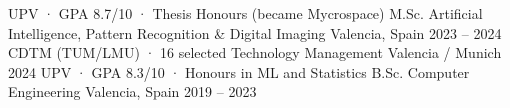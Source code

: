 \nopagebreak
\begin{cventries}
\cvkeep
\cvdegree
    {UPV · GPA 8.7/10 · Thesis Honours (became Mycrospace)}
    {M.Sc. Artificial Intelligence, Pattern Recognition \& Digital Imaging}
    {Valencia, Spain}
    {2023 – 2024}
\cvkeep
\cvdegree
    {CDTM (TUM/LMU) · 16 selected}
    {Technology Management}
    {Valencia / Munich}
    {2024}
\cvkeep
\cvdegree
    {UPV · GPA 8.3/10 · Honours in ML and Statistics}
    {B.Sc. Computer Engineering}
    {Valencia, Spain}
    {2019 – 2023}
\end{cventries}
